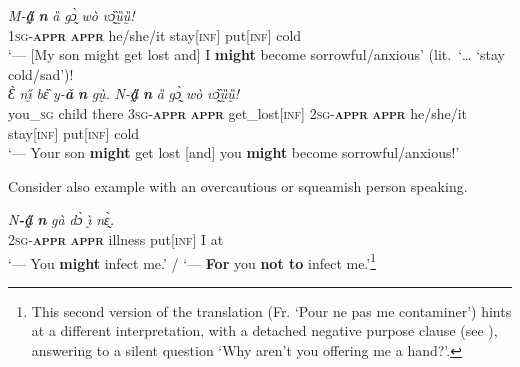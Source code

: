 \documentclass[output=paper,colorlinks,citecolor=brown]{langscibook}
\begin{document}
\z



\ea \label{ex:Fed13}
\ea \label{ex:Fed13a}
\gll \textit{M-\textbf{a̰̋}} \textit{\textbf{n{\ù}}} \textit{ȁ} \textit{gɔ̰̀} \textit{wò} \textit{vɔ̰̏ṵ̏ṵ̏!} \\
\textsc{1sg-\textbf{appr}} \textbf{\textsc{appr}} he/she/it stay[\textsc{inf}] put\textsc{[inf]} cold \\
 `--- [My son might get lost and] I \textbf{might} become sorrowful/anxious' (lit.\ `{\dots} `stay cold/sad')! \\
\ex \label{ex:Fed13b}
\gll \textit{Ɛ̀} \textit{nı̰̋} \textit{bɛ̏} \textit{y-\textbf{ǎ}} \textit{\textbf{n{\ù}}} \textit{gṵ̀{\à}.} \textit{N-\textbf{a̰̋}} \textit{\textbf{n{\ù}}} \textit{ȁ} \textit{gɔ̰̀} \textit{wò} \textit{vɔ̰̏ṵ̏ṵ̏!} \\
you\_\textsc{sg} child there \textsc{3sg-\textbf{appr}} \textsc{\textbf{appr}} get\_lost[\textsc{inf}] \textsc{2sg-\textbf{appr}} \textsc{\textbf{appr}} he/she/it stay[\textsc{inf}] put\textsc{[inf]} cold \\
 `--- Your son \textbf{might} get lost [and] you \textbf{might} become sorrowful/anxious!'
\z
\z

 Consider also example  with an overcautious or squeamish person speaking.


\ea \label{ex:Fed14}
\gll \textit{N\textbf{-a̰̋}} \textit{\textbf{n{\ù}}} \textit{gà} \textit{dɔ̀} \textit{ı̰̀} \textit{nɛ̰̀.} \\
\textsc{2sg-\textbf{appr}} \textsc{\textbf{appr}} illness put\textsc{[inf]} I at \\
 `--- You \textbf{might} infect me.' / `--- \textbf{For} you \textbf{not to} infect me.'\footnote{This second version of the translation (Fr. `Pour ne pas me contaminer') hints at a different interpretation, with a detached negative purpose clause (see ), answering to a silent question `Why aren't you offering me a hand?'.}
\z
\end{document}
